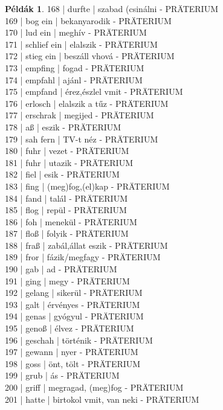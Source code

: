 \documentclass{article}
\theoremstyle{definition}
\newtheorem*{exmp}{Példák}
\begin{document}
\begin{exmp}
168 | durfte | szabad (csinálni - PRÄTERIUM\\
169 | bog ein | bekanyarodik - PRÄTERIUM\\
170 | lud ein | meghív - PRÄTERIUM\\
171 | schlief ein | elalszik - PRÄTERIUM\\
172 | stieg ein | beszáll vhová - PRÄTERIUM\\
173 | empfing | fogad - PRÄTERIUM\\
174 | empfahl | ajánl - PRÄTERIUM\\
175 | empfand | érez,észlel vmit - PRÄTERIUM\\
176 | erlosch | elalszik a tűz - PRÄTERIUM\\
177 | erschrak | megijed - PRÄTERIUM\\
178 | aß | eszik - PRÄTERIUM\\
179 | sah fern | TV-t néz - PRÄTERIUM\\
180 | fuhr | vezet - PRÄTERIUM\\
181 | fuhr  | utazik - PRÄTERIUM\\
182 | fiel | esik - PRÄTERIUM\\
183 | fing | (meg)fog,(el)kap - PRÄTERIUM\\
184 | fand | talál - PRÄTERIUM\\
185 | flog | repül - PRÄTERIUM\\
186 | foh | menekül - PRÄTERIUM\\
187 | floß | folyik - PRÄTERIUM\\
188 | fraß | zabál,állat eszik - PRÄTERIUM\\
189 | fror | fázik/megfagy - PRÄTERIUM\\
190 | gab | ad - PRÄTERIUM\\
191 | ging  | megy - PRÄTERIUM\\
192 | gelang | sikerül - PRÄTERIUM\\
193 | galt | érvényes - PRÄTERIUM\\
194 | genas | gyógyul - PRÄTERIUM\\
195 | genoß | élvez - PRÄTERIUM\\
196 | geschah | történik - PRÄTERIUM\\
197 | gewann | nyer - PRÄTERIUM\\
198 | goss | önt, tölt - PRÄTERIUM\\
199 | grub | ás - PRÄTERIUM\\
200 | griff | megragad, (meg)fog - PRÄTERIUM\\
201 | hatte | birtokol vmit, van neki - PRÄTERIUM\\

\end{exmp}
\end{document}
